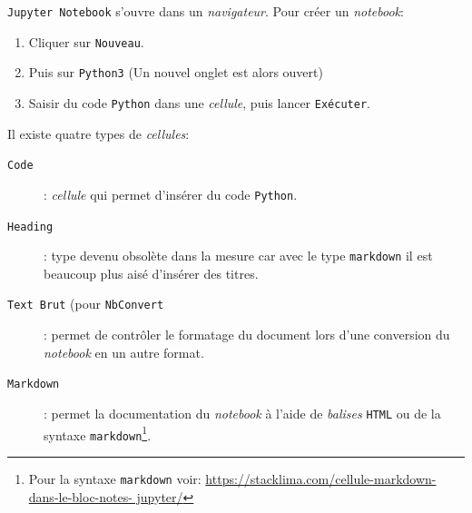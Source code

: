 \texttt{Jupyter Notebook} s'ouvre dans un \textit{navigateur}. Pour créer un \textit{notebook}:
\begin{enumerate}
	\item Cliquer sur \texttt{Nouveau}.
	\item Puis sur \texttt{Python3} (Un nouvel onglet est alors ouvert)
	\item Saisir du code \texttt{Python} dans une \textit{cellule}, puis lancer \texttt{Exécuter}.
\end{enumerate}
\medskip

Il existe quatre types de \textit{cellules}: 
\begin{description}
	\item[\texttt{Code}]: \textit{cellule} qui permet d'insérer du code \texttt{Python}.
	\item[\texttt{Heading}]: type devenu obsolète dans la mesure car avec le type \texttt{markdown} il est beaucoup plus aisé d'insérer des titres.
	\item[\texttt{Text Brut} (pour \texttt{NbConvert}]: permet de contrôler le formatage du document lors d'une conversion du \textit{notebook} en un autre format.
	\item[\texttt{Markdown}]: permet la documentation du \textit{notebook} à l'aide de \textit{balises} \texttt{HTML} ou de la syntaxe \texttt{markdown}\footnote{Pour la syntaxe \texttt{markdown} voir: \url{https://stacklima.com/cellule-markdown-dans-le-bloc-notes- jupyter/}}.
\end{description}
\medskip
